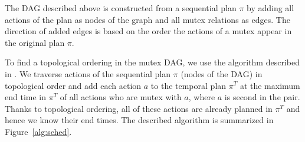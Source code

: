The DAG described above is constructed
from a sequential plan $\pi$ by adding
all actions of the plan as nodes of the graph
and all mutex relations as edges.
The direction of added edges is based on the order
the actions of a mutex appear in the original plan $\pi$.

To find a topological ordering in the mutex DAG,
we use the algorithm described in \citet{Kahn1962}.
We traverse actions of the sequential plan $\pi$
(nodes of the DAG)
in topological order and add each action $a$
to the temporal plan $\pi^T$
at the maximum end time in $\pi^T$ of all actions
who are mutex with $a$, where $a$ is second in the pair.
Thanks to topological ordering, all of these actions
are already planned in $\pi^T$ and hence we know their end times.
The described algorithm is summarized in Figure~\ref{alg:sched}.

